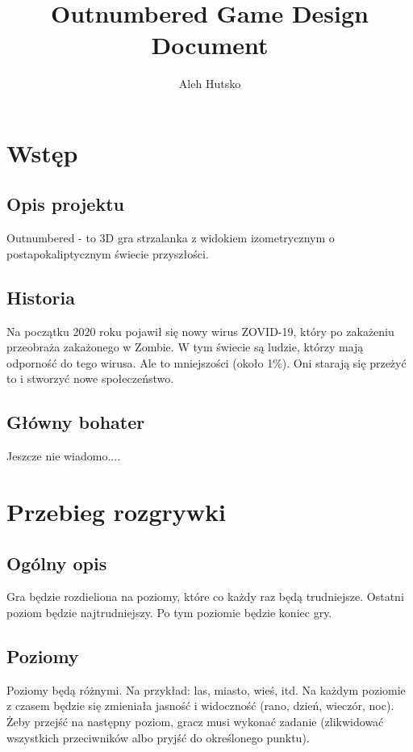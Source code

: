 \documentclass[letterpaper,12pt]{report}
\author{Aleh Hutsko}
\title{Outnumbered Game Design Document}
\date{}
\begin{document}
	\maketitle
	\clearpage
	\tableofcontents
	\clearpage
	\chapter{Wstęp}
	\section{Opis projektu}
	
	Outnumbered - to 3D gra strzalanka z widokiem
	izometrycznym o postapokaliptycznym świecie przyszłości.
	
	\section{Historia}
	
	Na początku 2020 roku pojawił się nowy wirus ZOVID-19,
	który po zakażeniu przeobraża zakażonego w Zombie. W tym
	świecie są ludzie, którzy mają odporność do tego wirusa.
	Ale to mniejszości (około 1\%). Oni starają się przeżyć to
	i stworzyć nowe społeczeństwo.
	
	
	\section{Główny bohater}
	
	\color{red}
	Jeszcze nie wiadomo....
	\color{black}
	
	
	\chapter{Przebieg rozgrywki}
	
	\section{Ogólny opis}
	
	Gra będzie rozdieliona na poziomy, które co każdy raz będą
	trudniejsze. Ostatni poziom będzie najtrudniejszy. Po tym 
	poziomie będzie koniec gry. 
	
	\section{Poziomy}
	
	Poziomy będą różnymi. Na przykład: las, miasto, wieś, itd.
	Na każdym poziomie z czasem będzie się zmieniała jasność i
	widoczność (rano, dzień, wieczór, noc). Żeby przejść na 
	następny poziom, gracz musi wykonać zadanie (zlikwidować wszystkich
	przeciwników albo pryjść do określonego punktu).  
	
\end{document}
